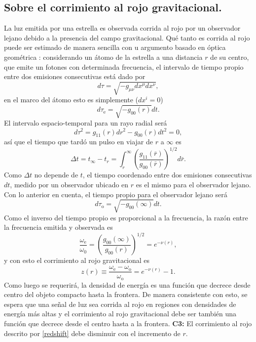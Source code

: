 \subsection*{ Sobre el corrimiento al rojo gravitacional.}
\noindent La luz emitida por una estrella es observada corrida al rojo por un observador lejano debido a la presencia del campo gravitacional. Qué tanto es corrida al rojo puede ser estimado de manera sencilla con u argumento basado en óptica geométrica \cite{Glendenning2000}: considerando un átomo de la estrella a una distancia $r$ de su centro, que emite un fotones con determinada frecuencia, el intervalo de tiempo propio entre dos emisiones consecutivas está dado por
\begin{equation}
d \tau=\sqrt{-g_{\mu \nu} d x^{\mu} d x^{\nu}},
\end{equation}
en el marco del átomo esto es simplemente ($dx^i=0$)
\begin{equation}
d \tau_{\mathrm{e}}=\sqrt{-g_{00}(r)} d t.
\end{equation}
El intervalo espacio-temporal para un rayo radial será
\begin{equation}
d \tau^{2}=g_{11}(r) d r^{2} - g_{00}(r) d t^{2} = 0,
\end{equation}
así que el tiempo que tardó un pulso en viajar de $r$ a $\infty$ es
\begin{equation}\label{timeinterval}
\Delta t=t_{\infty}-t_{r}= \int_{r}^{\infty}\left(\frac{g_{11}(\bar{r})}{g_{00}(\bar{r})}\right)^{1 / 2} d \bar{r}.
\end{equation}
Como $\Delta{t}$ no depende de $t$, el tiempo coordenado entre dos emisiones consecutivas $dt$, medido por un observador ubicado en $r$ es el mismo para el observador lejano. Con lo anterior en cuenta, el tiempo propio para el observador lejano será
\begin{equation}
d \tau_{\mathrm{o}}=\sqrt{-g_{00}(\infty)} d t.
\end{equation}
Como el inverso del tiempo propio es proporcional a la frecuencia, la razón entre la frecuencia emitida y observada es
\begin{equation}
\frac{\omega_{\mathrm{e}}}{\omega_{\mathrm{0}}}=\left(\frac{g_{00}(\infty)}{g_{00}(r)}\right)^{1 / 2}=e^{-\nu(r)},
\end{equation}
y con esto el corrimiento al rojo gravitacional es
\begin{equation}
    z(r)\equiv \frac{\omega_{\mathrm{e}}-\omega_{\mathrm{o}}}{\omega_{\mathrm{o}}}  = e^{-\nu(r)}-1.
    \label{redshift}
\end{equation}
Como luego se requerirá, la densidad de energía es una función que decrece desde centro del objeto compacto hasta la frontera. De manera consistente con esto, se espera que una señal de luz sea corrida al rojo en regiones con densidades de energía más altas y el corrimiento al rojo gravitacional debe ser también una función que decrece desde el centro hasta a la frontera.
\textbf{C3:} El corrimiento al rojo descrito por \eqref{redshift} debe disminuir con el incremento de $r$.
